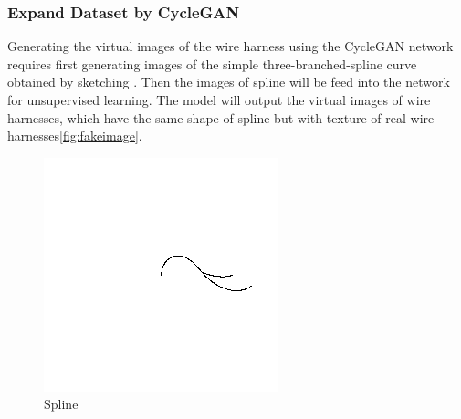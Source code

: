 \subsubsection{Expand Dataset by CycleGAN}
	Generating the virtual images of the wire harness using the CycleGAN network requires first generating images of the simple three-branched-spline curve 
	obtained by sketching . Then the images of spline will be feed into the network for unsupervised learning. The model will output the virtual 
	images of wire harnesses, which have the same shape of spline but with texture of real wire harnesses\autoref{fig:fakeimage}.
	\begin{figure}
		\centering
		\includegraphics[width=0.6\linewidth]{example_images/CycleGAN_spline}
		\caption{Spline}
		\label{fig:Spline}
	\end{figure}


